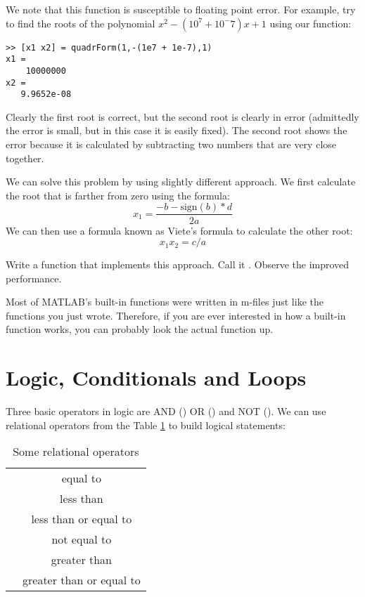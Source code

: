 We note that this function is susceptible to floating point error. For example, try to find the roots of the polynomial $x^2 - (10^7 + 10^-7)x + 1$ using our function:

\begin{lstlisting}[style=matlab]
>> [x1 x2] = quadrForm(1,-(1e7 + 1e-7),1)
x1 =
    10000000
x2 =
   9.9652e-08
\end{lstlisting}

Clearly the first root is correct, but the second root is clearly in error (admittedly the error is small, but in this case it is easily fixed). The second root shows the error because it is calculated by subtracting two numbers that are very close together.

We can solve this problem by using slightly different approach. We first calculate the root that is farther from zero using the formula:
\[
x_1 = \frac{-b - \text{sign}(b)*d}{2a}
\]
We can then use a formula known as Viete's formula to calculate the other root:
\[
x_1 x_2 = c/a
\]

\begin{problem}
Write a function that implements this approach. Call it . Observe the improved performance.
\end{problem}

Most of MATLAB's built-in functions were written in m-files just like the functions you just wrote. Therefore, if you are ever interested in how a built-in function works, you can probably look the actual function up.


\section*{Logic, Conditionals and Loops}


Three basic operators in logic are AND (\li{&&}) OR (\li{||}) and NOT (\li{\~}). We can use relational operators from the Table \ref{tbl:relops} to build logical statements:

\begin{table}[h!]
\begin{center}
\begin{tabular}{|c|c|}
	\hline
	\li{==} & equal to\\
	\li{<} & less than\\
	\li{<=} & less than or equal to\\
	\li{\~} & not equal to\\
	\li{>} & greater than\\
	\li{>=} & greater than or equal to\\
	\hline
\end{tabular}
\caption{Some relational operators}
\label{tbl:relops}
\end{center}
\end{table}

